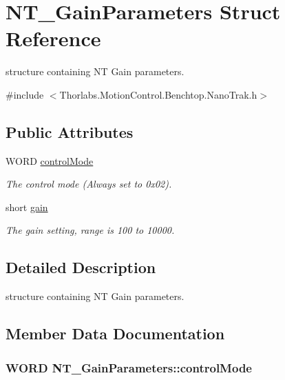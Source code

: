 \hypertarget{struct_n_t___gain_parameters}{}\section{N\+T\+\_\+\+Gain\+Parameters Struct Reference}
\label{struct_n_t___gain_parameters}


structure containing NT Gain parameters.  




{\ttfamily \#include $<$Thorlabs.\+Motion\+Control.\+Benchtop.\+Nano\+Trak.\+h$>$}

\subsection*{Public Attributes}
\begin{DoxyCompactItemize}
\item 
W\+O\+RD \hyperlink{struct_n_t___gain_parameters_a66985d6e151b9cba95c49f8ffb638f42}{control\+Mode}
\begin{DoxyCompactList}\small\item\em The control mode (Always set to 0x02). \end{DoxyCompactList}\item 
short \hyperlink{struct_n_t___gain_parameters_a498c084c73b88ed17b08114bb36f72b7}{gain}
\begin{DoxyCompactList}\small\item\em The gain setting, range is 100 to 10000. \end{DoxyCompactList}\end{DoxyCompactItemize}


\subsection{Detailed Description}
structure containing NT Gain parameters. 



\subsection{Member Data Documentation}
\subsubsection[{\texorpdfstring{control\+Mode}{controlMode}}]{\setlength{\rightskip}{0pt plus 5cm}W\+O\+RD N\+T\+\_\+\+Gain\+Parameters\+::control\+Mode}\hypertarget{struct_n_t___gain_parameters_a66985d6e151b9cba95c49f8ffb638f42}{}\label{struct_n_t___gain_parameters_a66985d6e151b9cba95c49f8ffb638f42}


